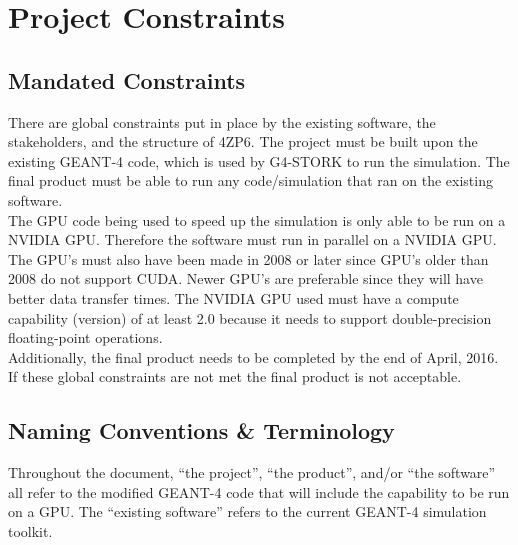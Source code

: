 \documentclass[12pt]{article}
\newcommand{\todo}[1]{\textcolor{red}{[TODO: #1]}} \else
\newcommand{\authornote}[3]{} \newcommand{\todo}[1]{} \fi
\newcommand{\ds}[1]{\authornote{blue}{DS}{#1}} %
\newcommand{\mmp}[1]{\authornote{green}{MP}{#1}}
\begin{document}
\section{Project Constraints}

\subsection{Mandated Constraints} %
There are global constraints put in place by the existing software, the stakeholders, and the structure of 4ZP6. The project must be built upon the existing GEANT-4 code, which is used by G4-STORK to run the simulation. The final product must be able to run any code/simulation that ran on the existing software.\\ 
The GPU code being used to speed up the simulation is only able to be run on a NVIDIA GPU. Therefore the software must run in parallel on a NVIDIA GPU. The GPU's must also have been made in 2008 or later since GPU's older than 2008 do not support CUDA. Newer GPU's are preferable since they will have better data transfer times. The NVIDIA GPU used must have a compute capability (version) of at least 2.0  because it needs to support double-precision floating-point operations.\\
Additionally, the final product needs to be completed by the end of April, 2016. If these global constraints are not met the final product is not acceptable.\\



\ds{Why an NVIDIA GPU? Was that constrained by your client?}\mmp{Added an explanation for why we are constrained to using an NVIDIA GPU}
\subsection{Naming Conventions \& Terminology} %
Throughout the document, ``the project'', ``the product'', and/or ``the software'' all refer to the modified GEANT-4 code that will include the capability to be run on a GPU. The ``existing software'' refers to the current GEANT-4 simulation toolkit.\\

\newpage %
\end{document}
